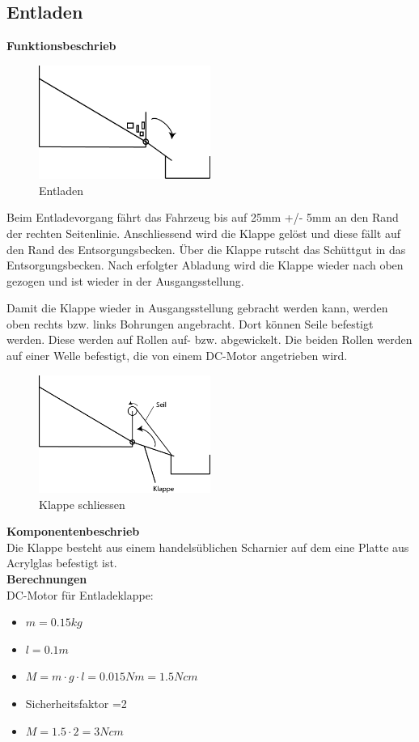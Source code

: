 \subsection{Entladen}

\textbf{Funktionsbeschrieb}\\[0.2cm]
\begin{figure}[H]
\centering
\includegraphics[width=0.5\textwidth]{03_Loesungskonzept/pictures/Entladen_Schraegbehaelter.png}
\caption{Entladen}
\end{figure}\flushleft

Beim Entladevorgang fährt das Fahrzeug bis auf 25mm +/- 5mm an den Rand der rechten Seitenlinie. Anschliessend wird die Klappe gelöst und diese fällt auf den Rand des Entsorgungsbecken. Über die Klappe rutscht das Schüttgut in das Entsorgungsbecken. Nach erfolgter Abladung wird die Klappe wieder nach oben gezogen und ist wieder in der Ausgangsstellung.

Damit die Klappe wieder in Ausgangsstellung gebracht werden kann, werden oben rechts bzw. links Bohrungen angebracht. Dort können Seile befestigt werden. Diese werden auf Rollen auf- bzw. abgewickelt. Die beiden Rollen werden auf einer Welle befestigt, die von einem DC-Motor angetrieben wird.\\[0.2cm]
\begin{figure}[H]
\centering
\includegraphics[width=0.5\textwidth]{03_Loesungskonzept/pictures/Klappe_schliessen.png}
\caption{Klappe schliessen}
\end{figure}\flushleft

\textbf{Komponentenbeschrieb}\\[0.2cm]
Die Klappe besteht aus einem handelsüblichen Scharnier auf dem eine Platte aus Acrylglas befestigt ist. \\[0.2cm]

\textbf{Berechnungen}\\[0.2cm]
DC-Motor für Entladeklappe:
\begin{itemize}
\item $m = 0.15kg$
\item $l = 0.1m$
\item $M = m\cdot g\cdot l = 0.015Nm = 1.5Ncm$
\item Sicherheitsfaktor =2
\item $M = 1.5\cdot 2 = 3Ncm$
\end{itemize} 